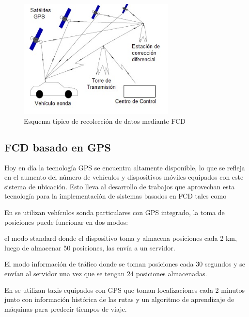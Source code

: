 \begin{figure}[h]
	\centering
	\includegraphics[width=0.7\textwidth]{capitulos/3/figuras/figura4.jpg}
	\caption{\label{fig:ComunicacionGPS} Esquema típico de recolección de datos mediante FCD}	
\end{figure}

\subsection{FCD basado en GPS}

Hoy en día la tecnología GPS se encuentra altamente disponible, lo que se refleja en el aumento del número de vehículos y dispositivos móviles equipados con este sistema de ubicación. Esto lleva al desarrollo de trabajos que aprovechan esta tecnología para la implementación de sistemas basados en FCD tales como  \cite{giovannini2011novel,li2007practical,sevlian2010travel,yin2004weight}

En \cite{giovannini2011novel} se utilizan vehículos sonda particulares con GPS integrado, la toma de posiciones puede funcionar en dos modos: \begin{enumerate*}[1)] \item el modo standard donde el dispositivo toma y almacena posiciones cada 2 km, luego de almacenar 50 posiciones, las envía a un servidor. \item El modo información de tráfico donde se toman posiciones cada 30 segundos y se envían al servidor una vez que se tengan 24 posiciones almacenadas.\end{enumerate*}

En \cite{sevlian2010travel} se utilizan taxis equipados con GPS que toman localizaciones cada 2 minutos junto con información histórica de las rutas y un algoritmo de aprendizaje de máquinas para predecir tiempos de viaje.


